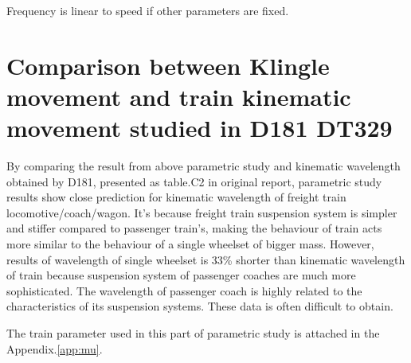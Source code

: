Frequency is linear to speed if other parameters are fixed.

\section{Comparison between Klingle movement and train kinematic movement studied in D181 DT329}

By comparing the result from above parametric study and kinematic wavelength obtained by D181, presented as table.C2 in original report, parametric study results show close prediction for kinematic wavelength of freight train locomotive/coach/wagon. It's because freight train suspension system is simpler and stiffer compared to passenger train's, making the behaviour of train acts more similar to the behaviour of a single wheelset of bigger mass. However, results of  wavelength of single wheelset is 33\% shorter than kinematic wavelength of train because suspension system of passenger coaches are much more sophisticated. The wavelength of passenger coach is highly related to the characteristics of its suspension systems. These data is often difficult to obtain. 



The train parameter used in this part of parametric study is attached in the Appendix.\ref{app:mu}. 

